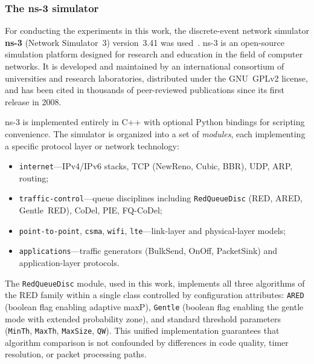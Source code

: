 \documentclass[default]{subfiles}
\begin{document}
{\subsubsection{The ns-3 simulator}

For conducting the experiments in this work, the discrete-event network simulator \textbf{ns-3} (Network Simulator~3) version~3.41 was used~\cite{ns3}. ns-3 is an open-source simulation platform designed for research and education in the field of computer networks. It is developed and maintained by an international consortium of universities and research laboratories, distributed under the GNU~GPLv2 license, and has been cited in thousands of peer-reviewed publications since its first release in 2008.

ns-3 is implemented entirely in C++ with optional Python bindings for scripting convenience. The simulator is organized into a set of \textit{modules}, each implementing a specific protocol layer or network technology:
\begin{itemize}
  \item \texttt{internet}---IPv4/IPv6 stacks, TCP (NewReno, Cubic, BBR), UDP, ARP, routing;
  \item \texttt{traffic-control}---queue disciplines including \texttt{RedQueueDisc} (RED, ARED, Gentle~RED), CoDel, PIE, FQ-CoDel;
  \item \texttt{point-to-point}, \texttt{csma}, \texttt{wifi}, \texttt{lte}---link-layer and physical-layer models;
  \item \texttt{applications}---traffic generators (BulkSend, OnOff, PacketSink) and application-layer protocols.
\end{itemize}

The \texttt{RedQueueDisc} module, used in this work, implements all three algorithms of the RED family within a single class controlled by configuration attributes: \texttt{ARED} (boolean flag enabling adaptive maxP), \texttt{Gentle} (boolean flag enabling the gentle mode with extended probability zone), and standard threshold parameters (\texttt{MinTh}, \texttt{MaxTh}, \texttt{MaxSize}, \texttt{QW}). This unified implementation guarantees that algorithm comparison is not confounded by differences in code quality, timer resolution, or packet processing paths.

}
\end{document}
